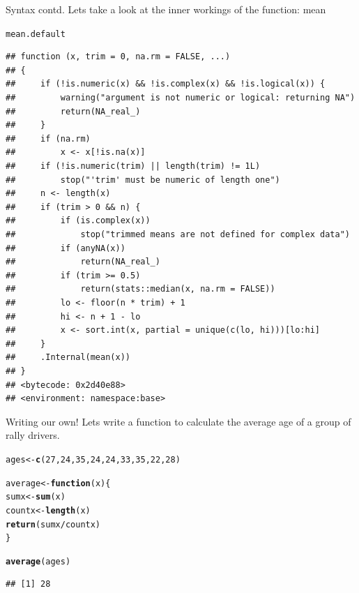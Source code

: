 \documentclass{beamer}\usepackage[]{graphicx}\usepackage[]{color}
\makeatletter
\newcommand{\hlnum}[1]{\textcolor[rgb]{0.686,0.059,0.569}{#1}}%
\newcommand{\hlopt}[1]{\textcolor[rgb]{0,0,0}{#1}}%
\newcommand{\hlstd}[1]{\textcolor[rgb]{0.345,0.345,0.345}{#1}}%
\newcommand{\hlkwa}[1]{\textcolor[rgb]{0.161,0.373,0.58}{\textbf{#1}}}%
\newcommand{\hlkwb}[1]{\textcolor[rgb]{0.69,0.353,0.396}{#1}}%
\newcommand{\hlkwc}[1]{\textcolor[rgb]{0.333,0.667,0.333}{#1}}%
\newcommand{\hlkwd}[1]{\textcolor[rgb]{0.737,0.353,0.396}{\textbf{#1}}}%
\newenvironment{kframe}{%
 \def\at@end@of@kframe{}%
 \ifinner\ifhmode%
  \def\at@end@of@kframe{\end{minipage}}%
  \begin{minipage}{\columnwidth}%
 \fi\fi%
 \def\FrameCommand##1{\hskip\@totalleftmargin \hskip-\fboxsep
 \colorbox{shadecolor}{##1}\hskip-\fboxsep
     \hskip-\linewidth \hskip-\@totalleftmargin \hskip\columnwidth}%
 \MakeFramed {\advance\hsize-\width
   \@totalleftmargin\z@ \linewidth\hsize
   \@setminipage}}%
 {\par\unskip\endMakeFramed%
 \at@end@of@kframe}
\newenvironment{knitrout}{}{} %
\makeatother
\begin{document}
\begin{frame}[fragile]{Syntax contd.}
Lets take a look at the inner workings of the function: mean
\begin{knitrout}
\color{fgcolor}\begin{kframe}
\begin{alltt}
\hlstd{mean.default}
\end{alltt}
\begin{verbatim}
## function (x, trim = 0, na.rm = FALSE, ...) 
## {
##     if (!is.numeric(x) && !is.complex(x) && !is.logical(x)) {
##         warning("argument is not numeric or logical: returning NA")
##         return(NA_real_)
##     }
##     if (na.rm) 
##         x <- x[!is.na(x)]
##     if (!is.numeric(trim) || length(trim) != 1L) 
##         stop("'trim' must be numeric of length one")
##     n <- length(x)
##     if (trim > 0 && n) {
##         if (is.complex(x)) 
##             stop("trimmed means are not defined for complex data")
##         if (anyNA(x)) 
##             return(NA_real_)
##         if (trim >= 0.5) 
##             return(stats::median(x, na.rm = FALSE))
##         lo <- floor(n * trim) + 1
##         hi <- n + 1 - lo
##         x <- sort.int(x, partial = unique(c(lo, hi)))[lo:hi]
##     }
##     .Internal(mean(x))
## }
## <bytecode: 0x2d40e88>
## <environment: namespace:base>
\end{verbatim}
\end{kframe}
\end{knitrout}

\end{frame}

\begin{frame}[fragile]{Writing our own!}
Lets write a function to calculate the average age of a group of rally drivers.
\begin{knitrout}
\color{fgcolor}\begin{kframe}
\begin{alltt}
\hlstd{ages} \hlkwb{<-} \hlkwd{c}\hlstd{(}\hlnum{27}\hlstd{,} \hlnum{24}\hlstd{,} \hlnum{35}\hlstd{,} \hlnum{24}\hlstd{,} \hlnum{24}\hlstd{,} \hlnum{33}\hlstd{,} \hlnum{35}\hlstd{,} \hlnum{22}\hlstd{,} \hlnum{28}\hlstd{)}

\hlstd{average} \hlkwb{<-} \hlkwa{function}\hlstd{(}\hlkwc{x}\hlstd{) \{}
    \hlstd{sumx} \hlkwb{<-} \hlkwd{sum}\hlstd{(x)}
    \hlstd{countx} \hlkwb{<-} \hlkwd{length}\hlstd{(x)}
    \hlkwd{return}\hlstd{(sumx}\hlopt{/}\hlstd{countx)}
\hlstd{\}}

\hlkwd{average}\hlstd{(ages)}
\end{alltt}
\begin{verbatim}
## [1] 28
\end{verbatim}
\end{kframe}
\end{knitrout}

\end{frame}
\end{document}
